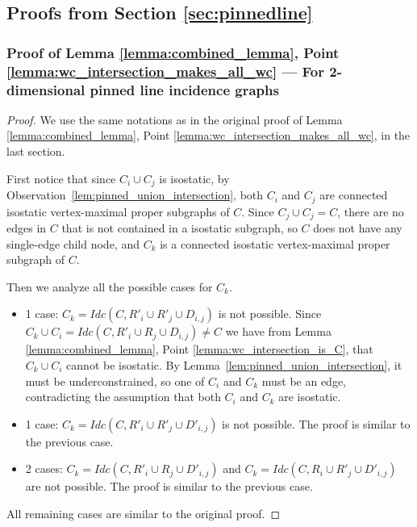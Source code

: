 \subsection{Proofs from Section \ref{sec:pinnedline}}
\subsubsection{Proof of Lemma \ref{lemma:combined_lemma}, Point \ref{lemma:wc_intersection_makes_all_wc} --- For 2-dimensional pinned line incidence graphs}
\label{sec:appendix_pinned}

\begin{proof} %
We use the same notations as in the original proof of Lemma \ref{lemma:combined_lemma}, Point \ref{lemma:wc_intersection_makes_all_wc}, in the last section.

First notice that since $C_i \cup C_j$ is isostatic, by Observation~\ref{lem:pinned_union_intersection},
both $C_i$ and $C_j$ are connected isostatic vertex-maximal proper subgraphs of  $C$.
Since $C_j \cup C_j = C$, there are no edges in $C$ that is not contained in a isostatic subgraph, so $C$ does not have any single-edge child node, and $C_k$ is a connected isostatic vertex-maximal proper subgraph of  $C$.

Then we analyze all the possible cases for $C_k$.
\begin{itemize}
    \item 1 case: $C_k=Idc(C,R'_i\cup R'_j\cup D_{i,j})$ is not possible. Since $C_k\cup C_i = Idc(C,R'_i\cup R_j\cup D_{i,j})\neq C$ we have from Lemma \ref{lemma:combined_lemma}, Point \ref{lemma:wc_intersection_is_C}, that $C_k\cup C_i$ cannot be isostatic.
    By Lemma~\ref{lem:pinned_union_intersection}, it must be underconstrained,
    so one of $C_i$ and $C_k$ must be an edge, contradicting the assumption that both $C_i$ and $C_k$ are isostatic.

    \item 1 case: $C_k=Idc(C,R'_i\cup R'_j\cup D'_{i,j})$ is not possible. The proof is similar to the previous case.

    \item 2 cases: $C_k=Idc(C,R'_i\cup R_j\cup D'_{i,j})$ and $C_k=Idc(C,R_i\cup R'_j\cup D'_{i,j})$ are not possible.
    The proof is similar to the previous case.
\end{itemize}

All remaining cases are similar to the original proof.
\end{proof}

